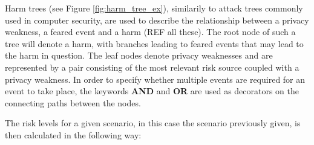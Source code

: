 Harm trees (see Figure \ref{fig:harm_tree_ex}), similarily to attack trees
commonly used in computer security\cite{de:hal-01302541}, are used to describe the
relationship between a privacy weakness, a feared event and a harm (REF all
these). The root node of such a tree will denote a harm, with branches leading
to feared events that may lead to the harm in question. The leaf nodes denote
privacy weaknesses and are represented by a pair consisting of the most relevant
risk source coupled with a privacy weakness. In order to specify whether
multiple events are required for an event to take place, the keywords
\textbf{AND} and \textbf{OR} are used as decorators on the connecting paths
between the nodes.

\bigskip

The risk levels for a given scenario, in this case the scenario previously
given, is then calculated in the following way\cite{de:hal-01302541}:



